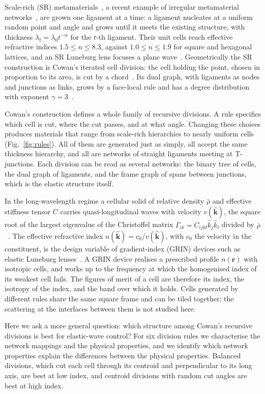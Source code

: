 \documentclass[aps,pre,twocolumn,superscriptaddress,amsmath,amssymb,floatfix]{revtex4-2}
\begin{document}
Scale-rich (SR) metamaterials~\cite{both2026}, a recent example of irregular
metamaterial networks~\cite{wytock2026}, are grown one ligament at a time: a ligament
nucleates at a uniform random point and angle and grows until it meets the existing
structure, with thickness $\lambda_t=\lambda_0t^{-\alpha}$ for the $t$-th ligament.
Their unit cells reach effective refractive indices $1.5\le n\le8.3$, against
$1.0\le n\le1.9$ for square and hexagonal lattices, and an SR Luneburg lens focuses a
plane wave~\cite{both2026}. Geometrically the SR construction is Cowan's iterated cell
division: the cell holding the point, chosen in proportion to its area, is cut by a
chord~\cite{cowan2010,vazquez2026sr}. Its dual graph, with ligaments as nodes and
junctions as links, grows by a face-local rule and has a degree distribution with
exponent $\gamma=3$~\cite{vazquez2026sr}.

Cowan's construction defines a whole family of recursive divisions. A rule specifies
which cell is cut, where the cut passes, and at what angle. Changing these choices
produces materials that range from scale-rich hierarchies to nearly uniform cells
(Fig.~\ref{fig:rules}). All of them are generated just as simply, all accept the same
thickness hierarchy, and all are networks of straight ligaments meeting at T-junctions.
Each division can be read as several networks: the binary tree of cells, the dual graph
of ligaments, and the frame graph of spans between junctions, which is the elastic
structure itself.

In the long-wavelength regime a cellular solid of relative density $\bar\rho$ and
effective stiffness tensor $C$ carries quasi-longitudinal waves with velocity
$v(\hat{\bm k})$, the square root of the largest eigenvalue of the Christoffel matrix
$\Gamma_{ik}=C_{ijkl}\hat k_j\hat k_l$ divided by $\bar\rho$~\cite{auld1973}. The
effective refractive index $n(\hat{\bm k})=c_0/v(\hat{\bm k})$, with $c_0$ the velocity
in the constituent, is the design variable of gradient-index (GRIN) devices such as
elastic Luneburg lenses~\cite{tol2017,aguzzi2022}. A GRIN device realises a prescribed
profile $n(\bm r)$ with isotropic cells, and works up to the frequency at which the
homogenised index of its weakest cell fails. The figures of merit of a cell are
therefore its index, the isotropy of the index, and the band over which it holds. Cells
generated by different rules share the same square frame and can be tiled together; the
scattering at the interfaces between them is not studied here.

Here we ask a more general question: which structure among Cowan's recursive divisions
is best for elastic-wave control? For six division rules we characterise the network
mappings and the physical properties, and we identify which network properties explain
the differences between the physical properties. Balanced divisions, which cut each
cell through its centroid and perpendicular to its long axis, are best at low index, and
centroid divisions with random cut angles are best at high index.
\end{document}
